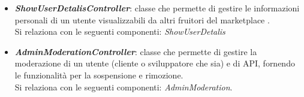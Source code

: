 \begin{itemize}
\begin{itemize}
		\item \textbf{\textit{ShowUserDetalisController}}: classe che permette di gestire le informazioni personali di un utente visualizzabili da altri fruitori del marketplace \progetto.\\
		Si relaziona con le seguenti componenti: \textit{ShowUserDetalis}
		
		
		
		\item \textbf{\textit{AdminModerationController}}: classe che permette di gestire la moderazione di un utente (cliente o sviluppatore che sia) e di API, fornendo le funzionalità per la sospensione e rimozione.\\
		Si relaziona con le seguenti componenti: \textit{AdminModeration}.
		
	\end{itemize}
\end{itemize}